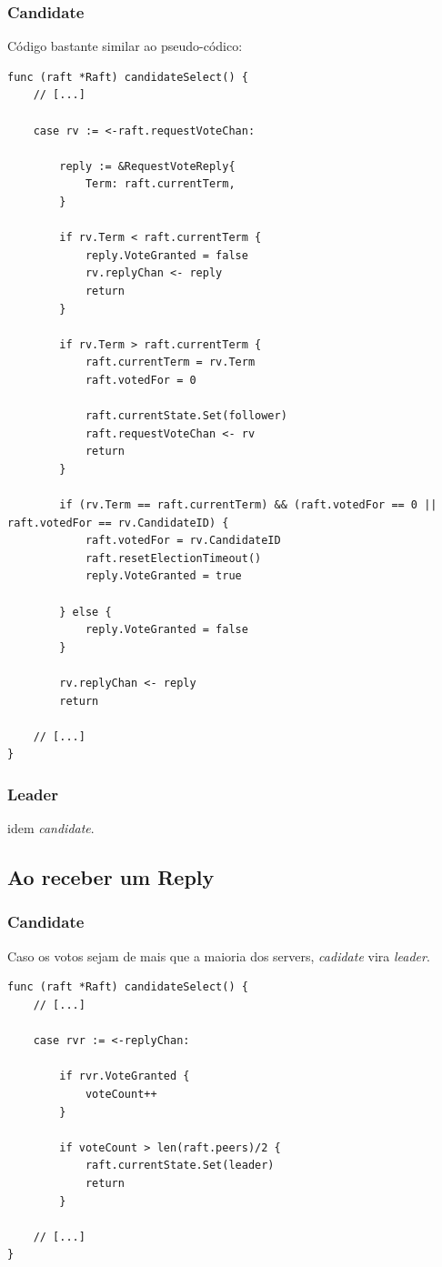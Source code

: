 \documentclass[journal,onecolumn]{IEEEtran}
\begin{document}
\subsubsection{Candidate} Código bastante similar ao pseudo-códico:

\begin{lstlisting}
func (raft *Raft) candidateSelect() {
	// [...]

	case rv := <-raft.requestVoteChan:
	
		reply := &RequestVoteReply{
			Term: raft.currentTerm,
		}

		if rv.Term < raft.currentTerm {
			reply.VoteGranted = false
			rv.replyChan <- reply
			return
		}

		if rv.Term > raft.currentTerm {
			raft.currentTerm = rv.Term
			raft.votedFor = 0

			raft.currentState.Set(follower)
			raft.requestVoteChan <- rv
			return
		}

		if (rv.Term == raft.currentTerm) && (raft.votedFor == 0 || raft.votedFor == rv.CandidateID) {
			raft.votedFor = rv.CandidateID
			raft.resetElectionTimeout()
			reply.VoteGranted = true

		} else {
			reply.VoteGranted = false
		}

		rv.replyChan <- reply
		return

	// [...]
}
\end{lstlisting}

\subsubsection{Leader} idem \textit{candidate}.

\subsection{Ao receber um Reply}

\subsubsection{Candidate} Caso os votos sejam de mais que a maioria dos servers, \textit{cadidate} vira \textit{leader}.

\begin{lstlisting}
func (raft *Raft) candidateSelect() {
	// [...]

	case rvr := <-replyChan:

		if rvr.VoteGranted {
			voteCount++
		}

		if voteCount > len(raft.peers)/2 {
			raft.currentState.Set(leader)
			return
		}

	// [...]
}
\end{lstlisting}
\end{document}
